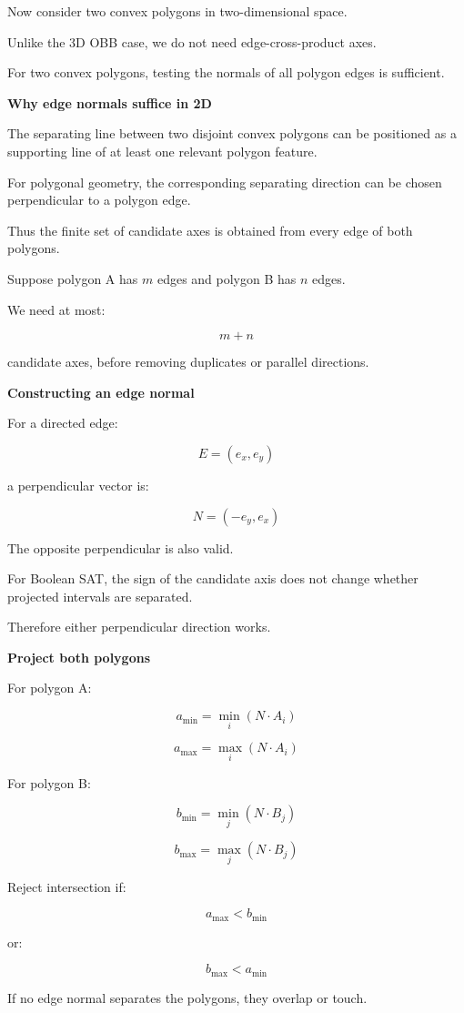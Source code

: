 Now consider two convex polygons in two-dimensional space.

Unlike the 3D OBB case, we do not need edge-cross-product axes.

For two convex polygons, testing the normals of all polygon edges is sufficient.

\textbf{Why edge normals suffice in 2D}

The separating line between two disjoint convex polygons can be positioned as a supporting line of at least one relevant polygon feature.

For polygonal geometry, the corresponding separating direction can be chosen perpendicular to a polygon edge.

Thus the finite set of candidate axes is obtained from every edge of both polygons.

Suppose polygon A has \(m\) edges and polygon B has \(n\) edges.

We need at most:

\[
\boxed{m+n}
\]

candidate axes, before removing duplicates or parallel directions.

\textbf{Constructing an edge normal}

For a directed edge:

\[
E=(e_x,e_y)
\]

a perpendicular vector is:

\[
\boxed{ N=(-e_y,e_x) }
\]

The opposite perpendicular is also valid.

For Boolean SAT, the sign of the candidate axis does not change whether projected intervals are separated.

Therefore either perpendicular direction works.

\textbf{Project both polygons}

For polygon A:

\[
a_{\min}=\min_i(N\cdot A_i)
\]

\[
a_{\max}=\max_i(N\cdot A_i)
\]

For polygon B:

\[
b_{\min}=\min_j(N\cdot B_j)
\]

\[
b_{\max}=\max_j(N\cdot B_j)
\]

Reject intersection if:

\[
a_{\max}<b_{\min}
\]

or:

\[
b_{\max}<a_{\min}
\]

If no edge normal separates the polygons, they overlap or touch.

